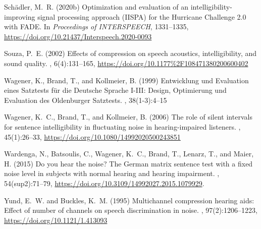 \documentclass[10pt,a4paper,twocolumn]{article}
\begin{document}
\begin{thebibliography}{}
	Schädler, M.~R. (2020b)
	\newblock Optimization and evaluation of an intelligibility-improving signal processing approach (IISPA) for the Hurricane Challenge 2.0 with FADE.
	\newblock In {\em Proceedings of INTERSPEECH}, 1331--1335, \url{https://doi.org/10.21437/Interspeech.2020-0093}
  
	Souza, P.~E. (2002)
	\newblock Effects of compression on speech acoustics, intelligibility, and sound quality.
	, 6(4):131--165, \url{https://doi.org/10.1177%2F108471380200600402}

    Wagener, K., Brand, T., and Kollmeier, B. (1999)
    \newblock Entwicklung und Evaluation eines Satztests für die Deutsche Sprache I-III: Design, Optimierung und Evaluation des Oldenburger Satztests.
    , 38(1-3):4--15
  
    Wagener, K.~C., Brand, T., and Kollmeier, B. (2006)
    \newblock The role of silent intervals for sentence intelligibility in fluctuating noise in hearing-impaired listeners.
    , 45(1):26--33, \url{https://doi.org/10.1080/14992020500243851}
  
	Wardenga, N., Batsoulis, C., Wagener, K.~C., Brand, T., Lenarz, T., and Maier, H. (2015)
	\newblock Do you hear the noise? The German matrix sentence test with a fixed noise level in subjects with normal hearing and hearing impairment.
	, 54(sup2):71--79, \url{https://doi.org/10.3109/14992027.2015.1079929}.
  
	Yund, E.~W. and Buckles, K.~M. (1995)
	\newblock Multichannel compression hearing aids: Effect of number of channels on speech discrimination in noise.
	, 97(2):1206--1223, \url{https://doi.org/10.1121/1.413093}
\end{thebibliography}
\end{document}
